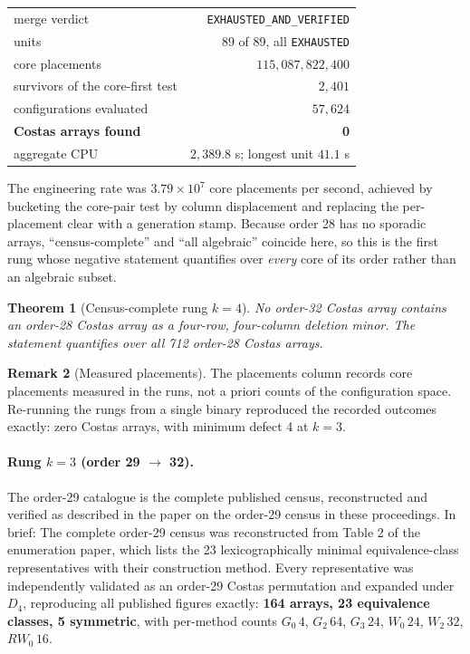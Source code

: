 \documentclass[11pt,a4paper,oneside]{report}
\newtheorem{theorem}{Theorem}[chapter]
\theoremstyle{definition}
\newtheorem{remark}[theorem]{Remark}
\begin{document}
\begin{center}
\begin{tabular}{@{}lr@{}}
\toprule
merge verdict & \texttt{EXHAUSTED\_AND\_VERIFIED} \\
units & 89 of 89, all \texttt{EXHAUSTED} \\
core placements & $115{,}087{,}822{,}400$ \\
survivors of the core-first test & $2{,}401$ \\
configurations evaluated & $57{,}624$ \\
\textbf{Costas arrays found} & \textbf{0} \\
aggregate CPU & $2{,}389.8$ s; longest unit $41.1$ s \\
\bottomrule
\end{tabular}
\end{center}

\noindent The engineering rate was $3.79\times10^7$ core placements per second,
achieved by bucketing the core-pair test by column displacement and replacing the
per-placement clear with a generation stamp. Because order 28 has no sporadic
arrays, ``census-complete'' and ``all algebraic'' coincide here, so this is the
first rung whose negative statement quantifies over \emph{every} core of its
order rather than an algebraic subset.

\begin{theorem}[Census-complete rung $k=4$]
\label{p3-thm:rung4census}
No order-32 Costas array contains an order-28 Costas array as a four-row, four-column deletion
minor. The statement quantifies over all 712 order-28 Costas arrays.
\end{theorem}

\begin{remark}[Measured placements]
\label{p3-rem:colconv}
The placements column records core placements measured in the runs, not a priori counts of the
configuration space. Re-running the rungs from a single binary reproduced the recorded outcomes
exactly: zero Costas arrays, with minimum defect 4 at $k=3$.
\end{remark}


\paragraph{Rung $k=3$ (order 29 $\to$ 32).}
The order-29 catalogue is the complete published census, reconstructed and verified as
described in the paper on the order-29 census in these proceedings. In brief: The complete order-29 census was reconstructed from Table 2 of the enumeration
paper, which lists the 23 lexicographically minimal equivalence-class
representatives with their construction method. Every representative was
independently validated as an order-29 Costas permutation and expanded under
$D_4$, reproducing all published figures exactly: \textbf{164 arrays, 23
equivalence classes, 5 symmetric}, with per-method counts
$G_0\,4$, $G_2\,64$, $G_3\,24$, $W_0\,24$, $W_2\,32$, $RW_0\,16$.
\end{document}
